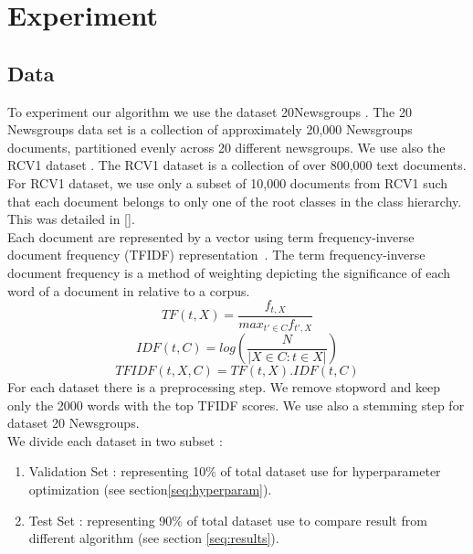 \section{Experiment}

\subsection{Data}
To experiment our algorithm we use the dataset 20Newsgroups \cite{Newsgroups20}.
The 20 Newsgroups data set is a collection of approximately 20,000 Newsgroups 
documents, partitioned evenly across 20 different newsgroups. We use also the 
RCV1 dataset \cite{Lewis:2004:RNB:1005332.1005345}. The RCV1 dataset is a 
collection of over 800,000 text documents. For RCV1 dataset, we use only a 
subset of 10,000 documents from RCV1 such that each document belongs to only 
one of the root classes in the class hierarchy. This was detailed in 
[\cite{Deap-K-Means}].\\
Each document are represented by a vector using term frequency-inverse document 
frequency (TFIDF) representation~\cite{doi:10.1108/eb026526}.
The term frequency-inverse document frequency is a method of weighting depicting 
the significance of each word of a document in relative to a corpus.
\begin{equation}
TF(t, X) = \frac{f_{t, X}}{max_{t' \in C}f_{t', X}} 
\end{equation}
\begin{equation}
IDF(t, C) = log(\frac{N}{|X \in C : t \in X|})
\end{equation}
\begin{equation}
TFIDF(t,X,C) = TF(t, X) . IDF(t, C)   
\end{equation}
For each dataset there is a preprocessing step. We remove stopword and keep only
the 2000 words with the top TFIDF scores. We use also a stemming step 
\cite{journals/mtcl/Lovins68} for dataset 20 Newsgroups. 
\\We divide each dataset in two subset :
\begin{enumerate}
\item Validation Set : representing 10\% of total dataset use for hyperparameter optimization (see section\ref{seq:hyperparam}).
\item Test Set : representing 90\% of total dataset use to compare result from different algorithm (see section \ref{seq:results}).
\end{enumerate} 

